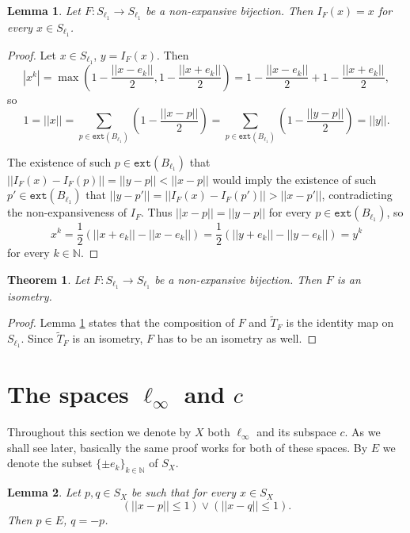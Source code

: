 \documentclass[reqno]{amsart}
\theoremstyle{plain}
\newtheorem{theorem}{Theorem}[section]
\newtheorem{lemma}{Lemma}[section]
\theoremstyle{remark}
\theoremstyle{definition}
\newcommand{\N}{\mathbb N}
\begin{document}
\begin{lemma}\label{l1lem5}
    Let $F:S_{\ell_1}\rightarrow S_{\ell_1}$ be a non-expansive bijection. Then $I_F(x)=x$ for every $x \in S_{\ell_1}$. 
\end{lemma}


\begin{proof}
    Let $x \in S_{\ell_1}$, $y=I_F(x)$. Then \[|x^k|=\max(1-\frac{||x-e_k||}2,1-\frac{||x+e_k||}2)=1-\frac{||x-e_k||}2+1 - \frac{||x+e_k||}2,\]
    so \[1=||x||  =\sum_{p\in \mathtt{ext}(B_{\ell_1})}\left(1-\frac{||x-p||}2\right)  =\sum_{p\in \mathtt{ext}(B_{\ell_1})}\left(1-\frac{||y-p||}2\right)=||y||.\] 
    
    The existence of such $p \in \mathtt{ext}(B_{\ell_1})$ that $||I_F(x)-I_F(p)||=||y-p||<||x-p||$ would imply the existence of such $p' \in \mathtt{ext}(B_{\ell_1})$ that $||y-p'||=||I_F(x)-I_F(p')||>||x-p'||$, contradicting the non-expansiveness of $I_F$. Thus $||x-p||=||y-p||$ for every $p \in \mathtt{ext}(B_{\ell_1})$, so \[x^k=\frac12(||x+e_k||-||x-e_k||)=\frac12(||y+e_k||-||y-e_k||)=y^k\] for every $k \in \N$.
\end{proof}



\begin{theorem}\label{l1main}
   Let $F:S_{\ell_1}\rightarrow S_{\ell_1}$ be a non-expansive bijection. Then $F$ is an isometry.
\end{theorem}
\begin{proof}
    Lemma \ref{l1lem5} states that the composition of $F$ and $\tilde{T}_F$ is the identity map on $S_{\ell_1}$. Since $\tilde{T}_F$ is an isometry, $F$ has to be an isometry as well.
\end{proof}



\section{The spaces $\ell_\infty$ and $c$}\label{linf}

Throughout this section we denote by $X$ both $\ell_\infty$ and its subspace $c$. As we shall see later, basically the same proof works for both of these spaces. By $E$ we denote the subset $\{\pm e_k\}_{k \in \N}$ of $S_X$.


\begin{lemma}\label{linf1}
    Let $p,q \in S_X$ be such that for every $x \in S_X$
    \begin{equation*}
        (||x-p||\leq1)\vee(||x-q||\leq1).
    \end{equation*}
    Then $p \in E$, $q=-p$.
\end{lemma}
\end{document}
